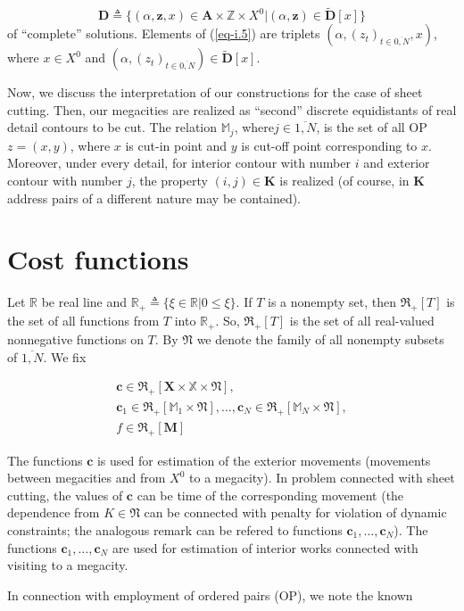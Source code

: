 \documentclass{article}
\begin{document}
\begin{equation}
  \label{eq-i.5}
  \mathbf D \triangleq
  \{
    (\alpha,\mathbf z, x) \in \mathbf A \times \mathbb Z \times X^0
  |
    (\alpha,\mathbf z) \in \tilde {\mathbf D}[x]
  \}
\end{equation}
of ``complete'' solutions.
Elements of (\ref{eq-i.5})
are triplets
$(\alpha,(z_t)_{t \in \overline{0,N}}, x)$,
where
$x \in X^0$
and
$(\alpha,(z_t)_{t \in \overline{0,N}}) \in \tilde {\mathbf D}[x]$.

Now, we discuss the interpretation of our constructions
for the case of sheet cutting.
Then, our megacities are realized as ``second''
discrete equidistants of real detail contours to be cut.
The relation
$\mathbb M_j$,
where$j \in \overline{1,N}$,
is the set of all OP
$z=(x,y)$,
where
$x$ is cut-in point and
$y$ is cut-off point corresponding to $x$.
Moreover,
under every detail,
for interior contour with number $i$
and exterior contour with number $j$,
the property
$(i,j) \in \mathbf K$
is realized
(of course, in $\mathbf K$
address pairs of a different nature
may be contained).

\section*{Cost functions}

Let
$\mathbb R$
be real line and
$\mathbb R_+ \triangleq \{ \xi \in \mathbb R | 0 \leqslant \xi\}$.
If $T$ is a nonempty set,
then
$\mathfrak R_+[T]$
is the set of all functions from $T$
into $\mathbb R_+$.
So,
$\mathfrak R_+[T]$
is the set of all real-valued nonnegative functions on $T$.
By
$\mathfrak N$
we denote the family of all nonempty subsets of
$\overline{1,N}$.
We fix

\begin{multline}
  \label{eq-i.6}
\mathbf c \in \mathfrak R_+[\mathbf X \times \mathbb X \times \mathfrak N], \\
\mathbf c_1 \in \mathfrak R_+[\mathbb M_1 \times \mathfrak N],
\dots ,
\mathbf c_N \in \mathfrak R_+[\mathbb M_N \times \mathfrak N], \\
f \in \mathfrak R_+[\mathbf M]
\end{multline}

The functions
$\mathbf c$
is used for estimation of the exterior movements
(movements between megacities and from $X^0$ to a megacity).
In problem connected with sheet cutting,
the values of
$\mathbf c$
can be time of the corresponding movement
(the dependence from
$K \in \mathfrak N$
can be connected with penalty for violation of dynamic constraints;
the analogous remark can be refered to functions
$\mathbf c_1, \dots, \mathbf c_N$).
The functions
$\mathbf c_1, \dots, \mathbf c_N$
are used for estimation of interior works
connected with visiting to a megacity.

In connection with employment of ordered pairs
(OP),
we note the known
\end{document}
